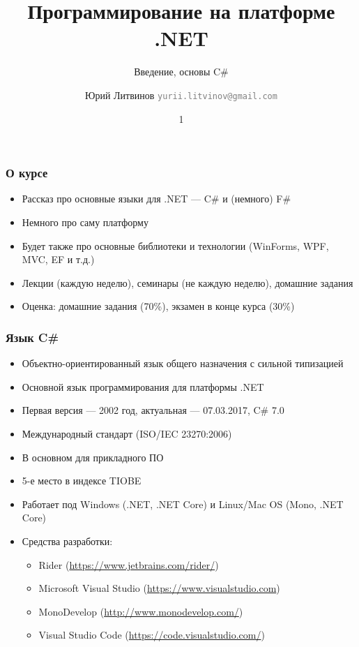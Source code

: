 \documentclass[xetex,mathserif,serif]{beamer}
\title{Программирование на платформе .NET}
\subtitle{Введение, основы C\#}
\author[Юрий Литвинов]{Юрий Литвинов \newline \textcolor{gray}{\small\texttt{yurii.litvinov@gmail.com}}}
\date{1}
\begin{document}
	
	\frame{\titlepage}
	
	\begin{frame}
		\frametitle{О курсе}
		\begin{itemize}
			\item Рассказ про основные языки для .NET --- C\# и (немного) F\#
			\item Немного про саму платформу
			\item Будет также про основные библиотеки и технологии (WinForms, WPF, MVC, EF и т.д.)
			\item Лекции (каждую неделю), семинары (не каждую неделю), домашние задания
			\item Оценка: домашние задания (70\%), экзамен в конце курса (30\%)
		\end{itemize}
	\end{frame}

	\begin{frame}
		\frametitle{Язык C\#}
		\begin{itemize}
			\item Объектно-ориентированный язык общего назначения с сильной типизацией
			\item Основной язык программирования для платформы .NET
			\item Первая версия --- 2002 год, актуальная --- 07.03.2017, C\# 7.0
			\item Международный стандарт (ISO/IEC 23270:2006)
			\item В основном для прикладного ПО
			\item 5-е место в индексе TIOBE
			\item Работает под Windows (.NET, .NET Core) и Linux/Mac OS (Mono, .NET Core)
			\item Средства разработки:
			\begin{itemize}
				\item Rider (\url{https://www.jetbrains.com/rider/})
				\item Microsoft Visual Studio (\url{https://www.visualstudio.com})
				\item MonoDevelop (\url{http://www.monodevelop.com/})
				\item Visual Studio Code (\url{https://code.visualstudio.com/})
			\end{itemize}
		\end{itemize}
	\end{frame}
\end{document}
